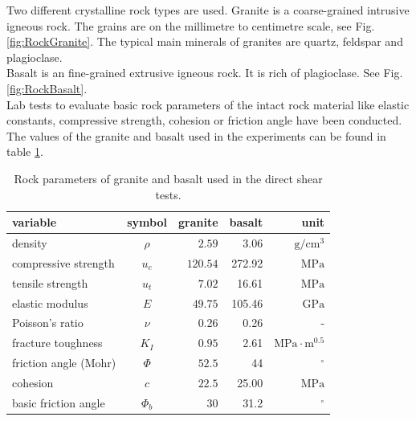Two different crystalline rock types are used. Granite is a coarse-grained intrusive igneous rock. The grains are on the millimetre to centimetre scale, see Fig. \ref{fig:RockGranite}. The typical main minerals of granites are quartz, feldspar and plagioclase.\\
Basalt is an fine-grained extrusive igneous rock. It is rich of plagioclase. See Fig. \ref{fig:RockBasalt}.\\
Lab tests to evaluate basic rock parameters of the intact rock material like elastic constants, compressive strength, cohesion or friction angle have been conducted. The values of the granite and basalt used in the experiments can be found in table \ref{table:MEX7_rockParam}.\\
\begin{table}[!ht]
\begin{center}
\begin{tabular}{l c r r r}
variable & symbol & granite & basalt & unit\\
\hline
density & $\rho$ & $2.59$ &3.06 &$\text{g}/\text{cm}^3$\\
compressive strength & $u_c$ & $120.54$&272.92 &$\text{MPa}   $\\
tensile strength & $u_t$ & $7.02$&16.61 &$ \text{MPa}   $\\
elastic modulus & $E$ & $49.75$&105.46 &$ \text{GPa}   $\\
Poisson's ratio & $\nu$ & 0.26 & 0.26  & -\\
fracture toughness & $K_I$ & $0.95$& 2.61 &$\text{MPa}\cdot\text{m}^{0.5}$\\
friction angle (Mohr) & $\Phi$ &  $52.5$& 44 &$^\circ$\\
cohesion & $c$ &  $22.5$& 25.00  &$ \text{MPa}   $\\
basic friction angle &$\Phi_b$ &30 & 31.2 & $^\circ$\\
\end{tabular}
\caption{Rock parameters of granite and basalt used in the direct shear tests.}
\label{table:MEX7_rockParam}
\end{center}
\end{table}
